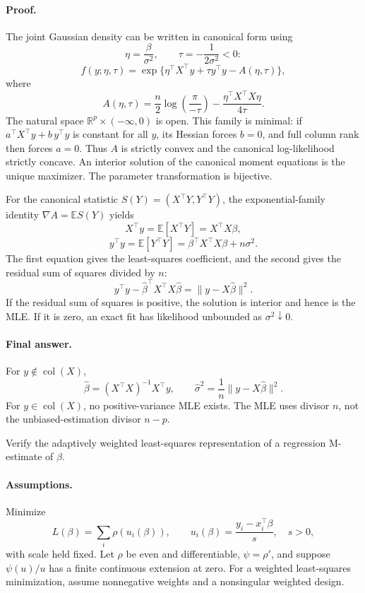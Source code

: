 \documentclass[answers,12pt,addpoints]{exam}
\providecommand{\E}{\mathbb{E}}
\providecommand{\R}{\mathbb{R}}
\begin{document}
\begin{questions}
\begin{solution}
\paragraph{Proof.}
The joint Gaussian density can be written in canonical form using
\[
\eta=\frac\beta{\sigma^2},\qquad \tau=-\frac1{2\sigma^2}<0:
\]
\[
f(y;\eta,\tau)
=\exp\{\eta^\top X^\top y+\tau y^\top y-A(\eta,\tau)\},
\]
where
\[
A(\eta,\tau)=\frac n2\log\left(\frac\pi{-\tau}\right)
-\frac{\eta^\top X^\top X\eta}{4\tau}.
\]
The natural space $\R^p\times(-\infty,0)$ is open. This family is
minimal: if $a^\top X^\top y+b\,y^\top y$ is constant for all $y$,
its Hessian forces $b=0$, and full column rank then forces $a=0$.
Thus $A$ is strictly convex and the canonical log-likelihood strictly
concave. An interior solution of the canonical moment equations is
the unique maximizer. The parameter transformation is bijective.

For the canonical statistic $S(Y)=(X^\top Y,Y^\top Y)$, the
exponential-family identity $\nabla A=\E S(Y)$ yields
\[
X^\top y=\E[X^\top Y]=X^\top X\beta,
\]
\[
y^\top y=\E[Y^\top Y]=\beta^\top X^\top X\beta+n\sigma^2.
\]
The first equation gives the least-squares coefficient, and the
second gives the residual sum of squares divided by $n$:
\[
y^\top y-\widehat\beta^\top X^\top X\widehat\beta
=\|y-X\widehat\beta\|^2.
\]
If the residual sum of squares is positive, the solution is interior
and hence is the MLE. If it is zero, an exact fit has likelihood
unbounded as $\sigma^2\downarrow0$.

\paragraph{Final answer.}
For $y\notin\operatorname{col}(X)$,
\[
\boxed{\widehat\beta=(X^\top X)^{-1}X^\top y,\qquad
\widehat\sigma^2=\frac1n\|y-X\widehat\beta\|^2.}
\]
For $y\in\operatorname{col}(X)$, no positive-variance MLE exists.
The MLE uses divisor $n$, not the unbiased-estimation divisor $n-p$.
\end{solution}

\question
Verify the adaptively weighted least-squares representation of a
regression M-estimate of $\beta$.

\begin{solution}
\paragraph{Assumptions.}
Minimize
\[
L(\beta)=\sum_i\rho(u_i(\beta)),\qquad
u_i(\beta)=\frac{y_i-x_i^\top\beta}{s},\quad s>0,
\]
with scale held fixed. Let $\rho$ be even and differentiable,
$\psi=\rho'$, and suppose $\psi(u)/u$ has a finite continuous
extension at zero. For a weighted least-squares minimization,
assume nonnegative weights and a nonsingular weighted design.


\end{solution}
\end{questions}
\end{document}
